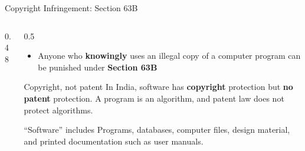 \documentclass[aspectratio=169,11pt,xcolor={table}]{beamer}
\newcommand{\comma}{,}
\begin{document}
\begin{frame}{Copyright Infringement: Section 63B}
  \begin{columns}[c]
    \begin{column}{0.48\textwidth}
      \centering
    \end{column}
    \begin{column}{0.5\textwidth}
      \begin{itemize}\small\setlength{\itemsep}{4pt}
        \item Anyone who \textbf{knowingly} uses an illegal copy of a computer program can be punished under \textbf{Section 63B}
      \end{itemize}
      \begin{block}{Copyright, not patent}
        \small In India, software has \textbf{copyright} protection but \textbf{no patent} protection. A program is an algorithm, and patent law does not protect algorithms.
      \end{block}
      \begin{exampleblock}{``Software'' includes}
        \small Programs, databases, computer files, design material, and printed documentation such as user manuals.
      \end{exampleblock}
    \end{column}
  \end{columns}
\end{frame}
\end{document}

